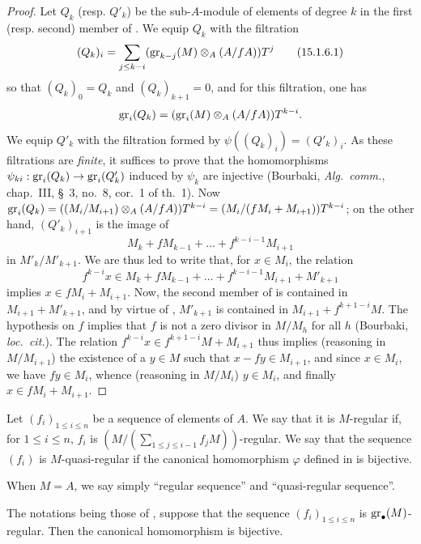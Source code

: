 \begin{proof}
Let $Q_k$ (resp. $Q'_k$) be the sub-$A$-module of elements of degree $k$ in the first (resp. second) member of .
We equip $Q_k$ with the filtration
\[
\label{0.15.1.6.1}
  (Q_k)_i = \sum_{j\leq k-i} (\operatorname{gr}_{k-j}(M)\otimes_A(A/fA))T^j
\tag{15.1.6.1}
\]
so that $(Q_k)_0=Q_k$ and $(Q_k)_{k+1}=0$, and for this filtration, one has
\[
  \operatorname{gr}_i(Q_k) = (\operatorname{gr}_i(M)\otimes_A(A/fA))T^{k-i}.
\]
We equip $Q'_k$ with the filtration formed by $\psi((Q_k)_i)=(Q'_k)_i$.
As these filtrations are \emph{finite}, it suffices to prove that the homomorphisms $\psi_{ki}:\operatorname{gr}_i(Q_k)\to\operatorname{gr}_i(Q'_k)$ induced by $\psi_k$ are injective
(Bourbaki, \emph{Alg.~comm.}, chap.~III, \S~3, no.~8, cor.~1 of th.~1).
Now $\operatorname{gr}_i(Q_k)=((M_i/M_{i+1})\otimes_A(A/fA))T^{k-i}=(M_i/(fM_i+M_{i+1}))T^{k-i}$;
on the other hand, $(Q'_k)_{i+1}$ is the image of
\[
  M_k+fM_{k-1}+\ldots+f^{k-i-1}M_{i+1}
\]
in $M'_k/M'_{k+1}$.
We are thus led to write that, for $x\in M_i$, the relation
\[
\label{0.15.1.6.2}
  f^{k-i}x\in M_k+fM_{k-1}+\ldots+f^{k-i-1}M_{i+1}+M'_{k+1}
\tag{15.1.6.2}
\]
implies $x\in fM_i+M_{i+1}$.
Now, the second member of  is contained in $M_{i+1}+M'_{k+1}$, and by virtue of , $M'_{k+1}$ is contained in $M_{i+1}+f^{k+1-i}M$.
The hypothesis on $f$ implies that $f$ is not a zero divisor in $M/M_h$ for all $h$
(Bourbaki, \emph{loc.~cit.}).
The relation $f^{k-i}x\in f^{k+1-i}M+M_{i+1}$ thus implies (reasoning
in $M/M_{i+1}$) the existence of a $y\in M$ such that $x-fy\in M_{i+1}$, and since $x\in M_i$, we have $fy\in M_i$, whence (reasoning in $M/M_i$) $y\in M_i$, and finally $x\in fM_i+M_{i+1}$.
\end{proof}

\begin{definition}[15.1.7]
\label{0.15.1.7}
Let $(f_i)_{1\leq i\leq n}$ be a sequence of elements of $A$.
We say that it is $M$-regular if, for $1\leq i\leq n$, $f_i$ is $(M/(\sum_{1\leq j\leq i-1}f_jM))$-regular.
We say that the sequence $(f_i)$ is $M$-quasi-regular if the canonical homomorphism $\varphi$ defined in  is bijective.
\end{definition}

When $M=A$, we say simply ``regular sequence'' and ``quasi-regular sequence''.

\begin{proposition}[15.1.8]
\label{0.15.1.8}
The notations being those of , suppose that the sequence $(f_i)_{1\leq i\leq n}$ is $\operatorname{gr}_\bullet(M)$-regular.
Then the canonical homomorphism  is bijective.
\end{proposition}

